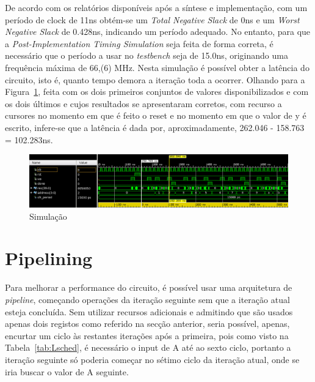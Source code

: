 \documentclass{article} %
\begin{document}
		\noindent De acordo com os relatórios disponíveis após a síntese e implementação, com um período de clock de 11ns obtém-se um \emph{Total Negative Slack} de 0ns e um \emph{Worst Negative Slack} de 0.428ns, indicando um período adequado. No entanto, para que a \emph{Post-Implementation Timing Simulation} seja feita de forma correta, é necessário que o período a usar no \emph{testbench} seja de 15.0ns, originando uma frequência máxima de 66,(6) MHz. Nesta simulação é possível obter a latência do circuito, isto é, quanto tempo demora a iteração toda a ocorrer. Olhando para a Figura~\ref{fig:Sim}, feita com os dois primeiros conjuntos de valores disponibilizados e com os dois últimos e cujos resultados se apresentaram corretos, com recurso a cursores no momento em que é feito o reset e no momento em que o valor de y é escrito, infere-se que a latência é dada por, aproximadamente, 262.046 - 158.763 = 102.283ns.\\ 

		\begin{figure}[ht]
			\begin{center}
				\includegraphics[width=6.5in]{sim.png}
				\caption{Simulação}
				\label{fig:Sim}
			\end{center}
		\end{figure}


	\section{Pipelining}

		Para melhorar a performance do circuito, é possível usar uma arquitetura de \emph{pipeline}, começando operações da iteração seguinte sem que a iteração atual esteja concluída. Sem utilizar recursos adicionais e admitindo que são usados apenas dois registos como referido na secção anterior, seria possível, apenas, encurtar um ciclo às restantes iterações após a primeira, pois como visto na Tabela~\ref{tab:Lsched}, é necessário o input de A até ao sexto ciclo, portanto a iteração seguinte só poderia começar no sétimo ciclo da iteração atual, onde se iria buscar o valor de A seguinte.\\

\end{document}
